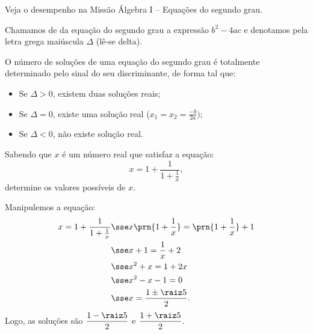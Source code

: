 \begin{onlineact}
Veja o desempenho na Missão Álgebra I -- Equações do segundo grau.
\end{onlineact}

\begin{definition}
    Chamamos de  da equação do segundo grau a expressão $b^2 - 4ac$ e denotamos pela letra grega maiúscula $\Delta$ (lê-se delta).
\end{definition}

\begin{remark}
    O número de soluções de uma equação do segundo grau é totalmente determinado pelo sinal do seu discriminante, de forma tal que:
    \begin{itemize}
        \item Se $\Delta > 0$, existem duas soluções reais;
        \item Se $\Delta = 0 $, existe uma solução real ($x_1 = x_2 = \frac{-b}{2a})$;
        \item Se $\Delta < 0$, não existe solução real.
    \end{itemize}
\end{remark}

\begin{example}
    Sabendo que $x$ é um número real que satisfaz a equação:
    \[
        x = 1 + \frac 1 {1 + \frac 1 x},
    \]
    determine os valores possíveis de $x$.
\end{example}

\begin{solution}
    Manipulemos a equação:
    \begin{align*}
        x = 1 + \dfrac 1 {1 + \frac 1 x} & \sse x \prn{1 + \dfrac 1 x } = \prn{ 1 + \dfrac 1 x }+1 \\
                                         & \sse x + 1 = \dfrac 1 x + 2 \\
                                         & \sse x^2 + x = 1 + 2x \\
                                         & \sse x^2 - x - 1 = 0 \\
                                         & \sse x = \dfrac{1 \pm\raiz 5} 2.
    \end{align*}
    Logo, as soluções são $\dfrac {1 - \raiz 5} 2$ e $\dfrac { 1 + \raiz 5 } 2$.
\end{solution}

